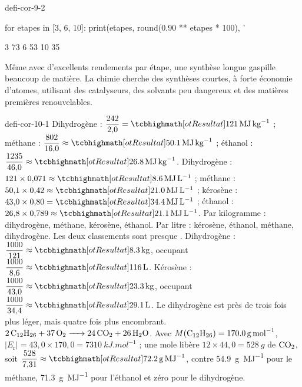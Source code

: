 \begin{blocEdition}{defi-cor-9-2}
\label{figedition-defi-cor-9-2-1}
\begin{python}
for etapes in [3, 6, 10]:
    print(etapes, round(0.90 ** etapes * 100), '%
\end{python}
\begin{console}
3 73 %
6 53 %
10 35 %
\end{console}
Même avec d'excellents rendements par étape, une synthèse longue gaspille beaucoup de matière. La chimie
 cherche des synthèses courtes, à forte économie d'atomes, utilisant des catalyseurs, des solvants peu
dangereux et des matières premières renouvelables.
\end{blocEdition}

\begin{blocEdition}{defi-cor-10-1}
Dihydrogène : $\dfrac{242}{2{,}0}=\res{\qty{121}{MJ.kg^{-1}}}$ ; méthane : $\dfrac{802}{16{,}0}\approx\res{\qty{50,1}{MJ.kg^{-1}}}$ ; éthanol : $\dfrac{1235}{46{,}0}\approx\res{\qty{26,8}{MJ.kg^{-1}}}$.
Dihydrogène : $121\times0{,}071\approx\res{\qty{8,6}{MJ.L^{-1}}}$ ; méthane : $50{,}1\times0{,}42\approx\res{\qty{21,0}{MJ.L^{-1}}}$ ; kérosène : $43{,}0\times0{,}80=\res{\qty{34,4}{MJ.L^{-1}}}$ ;
éthanol : $26{,}8\times0{,}789\approx\res{\qty{21,1}{MJ.L^{-1}}}$. Par kilogramme : dihydrogène, méthane, kérosène, éthanol. Par litre : kérosène,
éthanol, méthane, dihydrogène. Les deux classements sont presque .
Dihydrogène : $\dfrac{1000}{121}\approx\res{\qty{8,3}{kg}}$, occupant $\dfrac{1000}{8{,}6}\approx\res{\qty{116}{L}}$. Kérosène : $\dfrac{1000}{43{,}0}\approx\res{\qty{23,3}{kg}}$, occupant
$\dfrac{1000}{34{,}4}\approx\res{\qty{29,1}{L}}$. Le dihydrogène est près de trois fois plus léger, mais quatre fois plus encombrant.
$\ce{2C12H26 + 37O2 -> 24CO2 + 26H2O}$. Avec $M(\ce{C12H26})=\qty{170,0}{g.mol^{-1}}$, $|E_\mathrm{r}|=43{,}0\times170{,}0=\qty{7310}{kJ.mol^{-1}}$ ; une mole libère
$12\times44{,}0=\qty{528}{g}$ de $\ce{CO2}$, soit $\dfrac{528}{7{,}31}\approx\res{\qty{72,2}{g.MJ^{-1}}}$, contre \qty{54,9}{g.MJ^{-1}} pour le méthane, \qty{71,3}{g.MJ^{-1}} pour l'éthanol et
zéro pour le dihydrogène.
\end{blocEdition}

